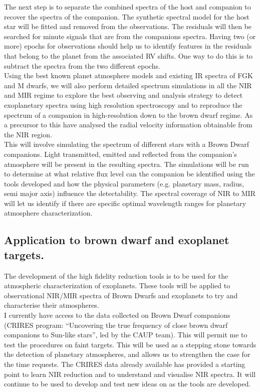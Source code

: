 \documentclass[pdftex,12pt,a4paper]{article}
\begin{document}
The next step is to separate the combined spectra of the host and companion to recover the spectra of the companion. The synthetic spectral model for the host star will be fitted and removed from the observations. The residuals will then be searched for minute signals that are from the companions spectra. Having two (or more) epochs for observations should help us to identify features in the residuals that belong to the planet from the associated RV shifts. One way to do this is to subtract the spectra from the two different epochs. \\

Using the best known planet atmosphere models and existing IR spectra of FGK and M dwarfs, we will also perform detailed spectrum simulations in all the NIR and MIR regime to explore the best observing and analysis strategy to detect exoplanetary spectra using high resolution spectroscopy and to reproduce the spectrum of a companion in high-resolution down to the brown dwarf regime. As a precursor to this \citet{Figueria2015prep} have analysed the radial velocity information obtainable from the NIR region.\\

This will involve simulating the spectrum of different stars with a Brown Dwarf companions. Light transmitted, emitted and reflected from the companion's atmosphere will be present in the resulting spectra. The simulations will be run to determine at what relative flux level can the companion be identified using the tools developed and how the physical parameters (e.g. planetary mass, radius,  semi major axis) influence the detectability. The spectral coverage of NIR to MIR will let us identify if there are specific optimal wavelength ranges for planetary atmosphere characterization. 

\subsection{Application to brown dwarf and exoplanet targets.}

The development of the high fidelity reduction tools is to be used for the atmospheric characterization of exoplanets. These tools will be applied to observational NIR/MIR spectra of Brown Dwarfs and exoplanets to try and characterise their atmospheres. \\

I currently have access to the data collected on Brown Dwarf companions (CRIRES program: ``Uncovering the true frequency of close brown dwarf companions to Sun-like stars'', led by the CAUP team). This will permit me to test the procedures on faint targets. This will be used as a stepping stone towards the detection of planetary atmospheres, and allows us to strengthen the case for the time requests. The CRIRES data already available has provided a starting point to learn NIR reduction and to understand and visualise NIR spectra. It will continue to be used to develop and test new ideas on as the tools are developed.\\
\end{document}
